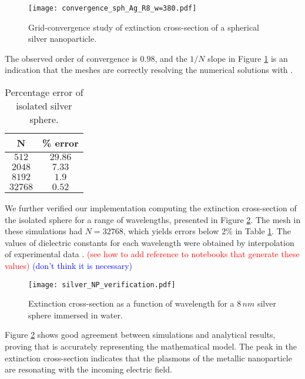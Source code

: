 \begin{figure}[h] %
   \centering
   \texttt{[image: convergence\_sph\_Ag\_R8\_w=380.pdf]} 
   \caption{Grid-convergence study of extinction cross-section of a spherical silver
            nanoparticle.}
   \label{fig:error_sphere_Ag}
\end{figure}

The observed order of convergence is $0.98$, and the $1/N$ slope in Figure \ref{fig:error_sphere_Ag}
is an indication that the meshes are correctly resolving the numerical solutions with \pygbe. 

\begin{table}[h]
    \centering
    \caption{\label{table:err_iso_sphere} Percentage error of isolated silver sphere.} 
    \begin{tabular}{c c}
    \hline%
    N & \% error \\
    \hline%
     $512$ & $29.86$ \\
     $2048$ & $7.33$ \\
     $8192$ & $1.9$ \\
     $32768$ & $0.52$ \\
    \hline%
    \end{tabular}
\end{table}

We further verified our implementation computing the extinction cross-section of the 
isolated sphere for a range of wavelengths, presented in Figure \ref{fig:verif_sphere}. 
The mesh in these simulations had $N=32768$, which yields errors below $2\%$ in Table \ref{table:err_iso_sphere}.
The values of dielectric constants for each wavelength were obtained by interpolation of 
experimental data \cite{JohnsonChristy1972, HaleQuerry1972}. \textcolor{red}{(see how to add
reference to notebooks that generate these values)} \textcolor{blue}{(don't think it is necessary)}


\begin{figure}[h] %
   \centering
   \texttt{[image: silver\_NP\_verification.pdf]} 
   \caption{Extinction cross-section as a function of wavelength for a $8 \, nm$
            silver sphere immersed in water.}
   \label{fig:verif_sphere}
\end{figure}

Figure \ref{fig:verif_sphere} shows good agreement between simulations and analytical results, proving
that \pygbe is accurately representing the mathematical model. The 
peak in the extinction cross-section indicates that the plasmons of the metallic
nanoparticle are resonating with the incoming electric field.


